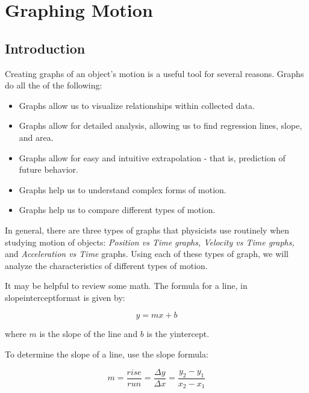 \chapter{Graphing Motion}

	\section{Introduction}
	Creating graphs of an object's motion is a useful tool for several reasons.  Graphs do all the of the following:
	\begin{itemize}
		\item Graphs allow us to visualize relationships within collected data.
		\item Graphs allow for detailed analysis, allowing us to find regression lines, slope, and area.
		\item Graphs allow for easy and intuitive extrapolation - that is, prediction of future behavior.
		\item Graphs help us to understand complex forms of motion.
		\item Graphs help us to compare different types of motion.
	\end{itemize}

In general, there are three types of graphs that physicists use routinely when studying motion of objects: \textit{Position vs Time graphs, Velocity vs Time graphs,} and \textit{Acceleration vs Time} graphs.  Using each of these types of graph, we will analyze the characteristics of different types of motion.

It may be helpful to review some math.  The formula for a line, in \gls{slopeinterceptformat} is given by:
\begin{mdframed}[backgroundcolor=orange!20!white]
\begin{equation}
	y = m x +b
\end{equation}
\end{mdframed}

where $m$ is the \gls{slope} of the line and $b$ is the \gls{yintercept}.

To determine the slope of a line, use the slope formula: 
\begin{mdframed}[backgroundcolor=orange!20!white]
	\begin{equation}
		m = \frac{rise}{run} = \frac{\Delta y} {\Delta x} = \frac{y_2-y_1}{x_2-x_1}
	\end{equation}
\end{mdframed}


